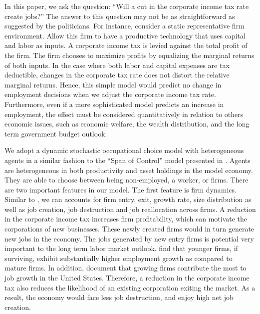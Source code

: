 \documentclass[12pt]{article}
\begin{document}
In this paper, we ask the question: ``Will a cut in the corporate income tax rate create
jobs?'' The answer to this question may not be as straightforward as suggested by
the politicians. For instance, consider a static representative firm
environment. Allow this firm to have a productive technology that uses
capital and labor as inputs. A corporate income tax is levied against the
total profit of the firm. The firm chooses to maximize profits by equalizing
the marginal returns of both inputs. In the case where both labor and capital expenses are tax deductible, changes in the corporate tax rate does not
distort the relative marginal returns. Hence, this simple
model would predict no change in employment decisions when we adjust the corporate income tax
rate. Furthermore, even if a more sophisticated model predicts an increase in employment, the effect must
be considered quantitatively in relation to others economic issues, such as economic welfare, the wealth distribution, and the long term government budget outlook.

We adopt a dynamic stochastic occupational choice model with heterogeneous agents in a similar fashion to the ``Span of Control'' model presented in \citet{LucasSpan}. Agents are heterogeneous in both productivity and asset holdings in the model economy. They are able to choose between being non-employed, a worker, or firms. There are two important features in our model. The first feature is firm dynamics. Similar to \citet{Hopenhayn1993}, we can accounts for firm entry, exit, growth rate, size distribution as well as job creation, job destruction and job reallocation across firms. A reduction in the corporate income tax increases firm profitability, which can motivate the corporations of new businesses. These newly created firms would in turn generate new jobs in the economy. The jobs generated by new entry firms is potential very important to the long term labor market outlook. \citet{Haltiwanger2013} find that younger firms, if surviving, exhibit substantially higher employment growth as compared to mature firms. In addition, \citet{Haltiwanger2013} document that growing firms contribute the most to job growth in the United States. Therefore, a reduction in the corporate income tax also reduces the likelihood of an existing corporation exiting the market. As a result, the economy would face less job destruction, and enjoy high net job creation.
\end{document}
